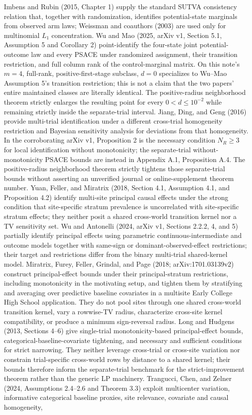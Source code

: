 \documentclass{article}
\begin{document}
Imbens and Rubin (2015, Chapter 1) supply the standard SUTVA consistency relation that, together with randomization, identifies potential-state marginals from observed arm laws; Weissman and coauthors (2003) are used only for multinomial \(L_1\) concentration. Wu and Mao (2025, arXiv v1, Section 5.1, Assumption 5 and Corollary 2) point-identify the four-state joint potential-outcome law and every PSACE under randomized assignment, their transition restriction, and full column rank of the control-marginal matrix. On this note's \(m=4\), full-rank, positive-first-stage subclass, \(d=0\) specializes to Wu--Mao Assumption 5's transition restriction; this is not a claim that the two papers' entire maintained classes are literally identical. The positive-radius neighborhood theorem strictly enlarges the resulting point for every \(0<d\le10^{-2}\) while remaining strictly inside the separate-trial interval. Jiang, Ding, and Geng (2016) provide multi-trial identification under a different cross-trial homogeneity restriction and Bayesian sensitivity analysis for deviations from that homogeneity. In the corroborating arXiv v1, Proposition 2 is the necessary condition \(N_R\ge3\) for local identification without monotonicity; the separate-trial without-monotonicity PSACE bounds are instead in Appendix A.1, Proposition A.4. The positive-radius neighborhood theorem strictly tightens those separate-trial bounds without asserting an unverified journal or online-supplement theorem number. Yuan, Feller, and Miratrix (2018, Section 4.1, Assumption 4.1, and Proposition 4.2) identify multi-site principal causal effects under the strong condition that site-specific stratum prevalence is uncorrelated with site-specific stratum effects; they neither posit a shared cross-world transition kernel nor a TV sensitivity set. Wu and Antonelli (2024, arXiv v1, Sections 2.2.2, 4, and 5) partially identify principal effects using parametric continuous-intermediate and outcome models together with same-sign or dominant-observed-effect restrictions; their target and restrictions differ from the binary multi-trial shared-kernel model. Miratrix, Furey, Feller, Grindal, and Page (2018; arXiv:1701.03139v2) construct principal-effect bounds under their principal-stratum restrictions, including monotonicity in the motivating setup, and tighten them by stratifying and averaging over predictive baseline covariates in a multisite Early College High School application. They do not pool sites through one shared cross-world transition kernel, vary a rowwise-TV radius, characterize cross-site kernel compatibility, or produce a minimum sign-reversal radius. Long and Hudgens (2013, Sections 4--6) give single-trial monotonicity-based principal-effect bounds, categorical-baseline-covariate tightening, and necessary and sufficient conditions for strict narrowing. They neither leverage cross-trial or cross-site variation nor constrain trial-specific cross-world rows by distance to a shared kernel; their bounds therefore inform the separate-trial benchmark for the strict-improvement theorem rather than the generic LP machinery. Trangucci, Chen, and Zelner (2024, Assumptions 2.4--2.6 and Theorem 3.3) exploit multicenter variation, informative categorical baseline proxies, site relevance, covariate and causal homogeneity, 
\end{document}
